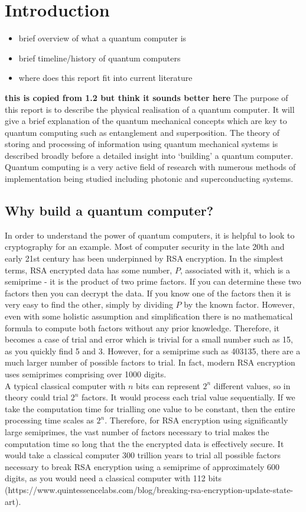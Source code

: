 \section{Introduction}
\begin{itemize}
    \item brief overview of what a quantum computer is
    \item brief timeline/history of quantum computers
    \item where does this report fit into current literature
\end{itemize}
{\bf this is copied from 1.2 but think it sounds better here}
The purpose of this report is to describe the physical realisation of a quantum computer. 
It will give a brief explanation of the quantum mechanical concepts which are key to quantum computing such as entanglement and superposition. 
The theory of storing and processing of information using quantum mechanical systems is described broadly before a detailed insight into `building' a quantum computer.
Quantum computing is a very active field of research with numerous methods of implementation being studied including photonic and superconducting systems. 
\subsection{Why build a quantum computer?}
In order to understand the power of quantum computers, it is helpful to look to cryptography for an example. Most of computer security in the late 20th and early 21st century has been underpinned by RSA encryption. In the simplest terms, RSA encrypted data has some number, $P$, associated with it, which is a semiprime - it is the product of two prime factors. If you can determine these two factors then you can decrypt the data. If you know one of the factors then it is very easy to find the other, simply by dividing $P$ by the known factor. However, even with some holistic assumption and simplification there is no mathematical formula to compute both factors without any prior knowledge. Therefore, it becomes a case of trial and error which is trivial for a small number such as 15, as you quickly find 5 and 3. However, for a semiprime such as 403135, there are a much larger number of possible factors to trial. In fact, modern RSA encryption uses semiprimes comprising over 1000 digits.\\

A typical classical computer with $n$ bits can represent $2^n$ different values, so in theory could trial $2^n$ factors. It would process each trial value sequentially. If we take the computation time for trialling one value to be constant, then the entire processing time scales as $2^n$. Therefore, for RSA encryption using significantly large semiprimes, the vast number of factors necessary to trial makes the computation time so long that the the encrypted data is effectively secure. It would take a classical computer 300 trillion years to trial all possible factors necessary to break RSA encryption using a semiprime of approximately 600 digits, as you would need a classical computer with 112 bits (https://www.quintessencelabs.com/blog/breaking-rsa-encryption-update-state-art).\\

